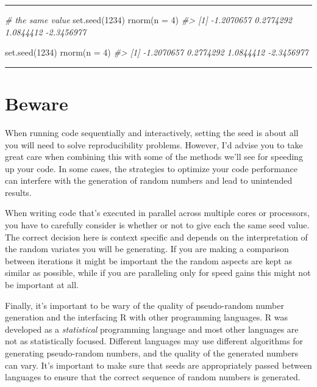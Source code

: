 \documentclass[
  12pt,
]{book}
\newenvironment{Shaded}{\begin{snugshade}}{\end{snugshade}}
\newcommand{\AttributeTok}[1]{\textcolor[rgb]{0.77,0.63,0.00}{#1}}
\newcommand{\CommentTok}[1]{\textcolor[rgb]{0.56,0.35,0.01}{\textit{#1}}}
\newcommand{\DecValTok}[1]{\textcolor[rgb]{0.00,0.00,0.81}{#1}}
\newcommand{\FunctionTok}[1]{\textcolor[rgb]{0.00,0.00,0.00}{#1}}
\newcommand{\NormalTok}[1]{#1}
\begin{document}
\begin{center}\rule{0.5\linewidth}{0.5pt}\end{center}

\begin{Shaded}
\begin{Highlighting}[]
\CommentTok{\# the same value}
\FunctionTok{set.seed}\NormalTok{(}\DecValTok{1234}\NormalTok{)}
\FunctionTok{rnorm}\NormalTok{(}\AttributeTok{n =} \DecValTok{4}\NormalTok{)}
\CommentTok{\#\textgreater{} [1] {-}1.2070657  0.2774292  1.0844412 {-}2.3456977}

\FunctionTok{set.seed}\NormalTok{(}\DecValTok{1234}\NormalTok{)}
\FunctionTok{rnorm}\NormalTok{(}\AttributeTok{n =} \DecValTok{4}\NormalTok{)}
\CommentTok{\#\textgreater{} [1] {-}1.2070657  0.2774292  1.0844412 {-}2.3456977}
\end{Highlighting}
\end{Shaded}

\begin{center}\rule{0.5\linewidth}{0.5pt}\end{center}

\hypertarget{beware}{%
\section{Beware}\label{beware}}

When running code sequentially and interactively, setting the seed is about all you will need to solve reproducibility problems. However, I'd advise you to take great care when combining this with some of the methods we'll see for speeding up your code. In some cases, the strategies to optimize your code performance can interfere with the generation of random numbers and lead to unintended results.

When writing code that's executed in parallel across multiple cores or processors, you have to carefully consider is whether or not to give each the same seed value. The correct decision here is context specific and depends on the interpretation of the random variates you will be generating. If you are making a comparison between iterations it might be important the the random aspects are kept as similar as possible, while if you are paralleling only for speed gains this might not be important at all.

Finally, it's important to be wary of the quality of pseudo-random number generation and the interfacing R with other programming languages. R was developed as a \emph{statistical} programming language and most other languages are not as statistically focused. Different languages may use different algorithms for generating pseudo-random numbers, and the quality of the generated numbers can vary. It's important to make sure that seeds are appropriately passed between languages to ensure that the correct sequence of random numbers is generated.
\end{document}
